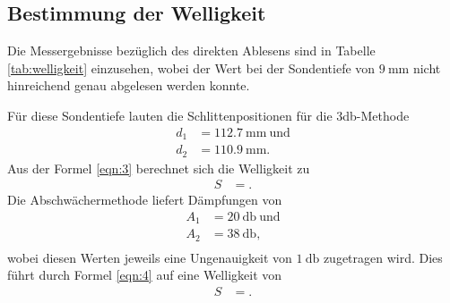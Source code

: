 \subsection{Bestimmung der Welligkeit}
Die Messergebnisse bezüglich des direkten Ablesens sind in Tabelle \ref{tab:welligkeit} einzusehen, wobei der Wert bei der Sondentiefe von $\SI{9}{\milli\meter}$ nicht hinreichend genau abgelesen werden konnte.

Für diese Sondentiefe lauten die Schlittenpositionen für die 3db-Methode
\begin{align*}
  d_1 &= \SI{112.7}{\milli\meter} \: \text{und}\\
  d_2 &= \SI{110.9}{\milli\meter}.
\end{align*}
Aus der Formel \ref{eqn:3} berechnet sich die Welligkeit zu
\begin{align*}
  S &= .
\end{align*}
Die Abschwächermethode liefert Dämpfungen von
\begin{align*}
  A_1 &= \SI{20}{\decibel} \: \text{und}\\
  A_2 &= \SI{38}{\decibel},\\
\end{align*}
wobei diesen Werten jeweils eine Ungenauigkeit von $\SI{1}{\decibel}$ zugetragen wird.
Dies führt durch Formel \ref{eqn:4} auf eine Welligkeit von
\begin{align*}
  S &= .
\end{align*}




